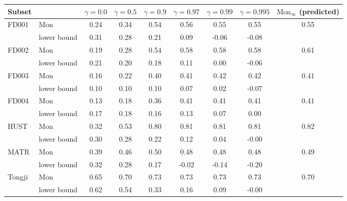 \begin{tabular}{l l c c c c c c c}
\hline
Subset & & $\gamma=0.0$ & $\gamma=0.5$ & $\gamma=0.9$ & $\gamma=0.97$ & $\gamma=0.99$ & $\gamma=0.995$ & $\mathrm{Mon}_\infty$ (predicted) \\
\hline
FD001 & $\mathrm{Mon}$ & 0.24 & 0.34 & 0.54 & 0.56 & 0.55 & 0.55 & 0.55 \\
 & lower bound & 0.31 & 0.28 & 0.21 & 0.09 & -0.06 & -0.08 & \\
FD002 & $\mathrm{Mon}$ & 0.19 & 0.28 & 0.54 & 0.58 & 0.58 & 0.58 & 0.61 \\
 & lower bound & 0.21 & 0.20 & 0.18 & 0.11 & 0.00 & -0.06 & \\
FD003 & $\mathrm{Mon}$ & 0.16 & 0.22 & 0.40 & 0.41 & 0.42 & 0.42 & 0.41 \\
 & lower bound & 0.10 & 0.10 & 0.10 & 0.07 & 0.02 & -0.07 & \\
FD004 & $\mathrm{Mon}$ & 0.13 & 0.18 & 0.36 & 0.41 & 0.41 & 0.41 & 0.41 \\
 & lower bound & 0.17 & 0.18 & 0.16 & 0.13 & 0.07 & 0.00 & \\
HUST & $\mathrm{Mon}$ & 0.32 & 0.53 & 0.80 & 0.81 & 0.81 & 0.81 & 0.82 \\
 & lower bound & 0.30 & 0.28 & 0.22 & 0.12 & 0.04 & -0.00 & \\
MATR & $\mathrm{Mon}$ & 0.39 & 0.46 & 0.50 & 0.48 & 0.48 & 0.48 & 0.49 \\
 & lower bound & 0.32 & 0.28 & 0.17 & -0.02 & -0.14 & -0.20 & \\
Tongji & $\mathrm{Mon}$ & 0.65 & 0.70 & 0.73 & 0.73 & 0.73 & 0.73 & 0.70 \\
 & lower bound & 0.62 & 0.54 & 0.33 & 0.16 & 0.09 & -0.00 & \\
\hline
\end{tabular}
